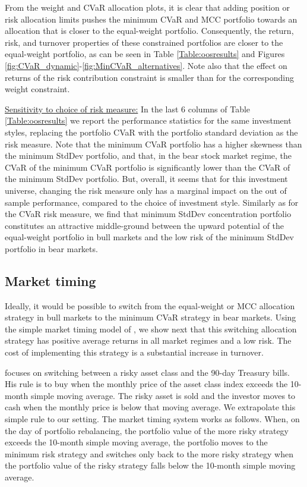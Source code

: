 \documentclass[12pt,a4paper]{article}
\begin{document}
From the weight and CVaR allocation plots, it is clear that adding position or risk allocation limits pushes the minimum CVaR and MCC portfolio towards an allocation that is closer to the equal-weight portfolio. Consequently, the return, risk, and turnover properties of these constrained portfolios are closer to the equal-weight portfolio, as can be seen in Table \ref{Table:oosresults} and Figures \ref{fig:CVaR_dynamic}-\ref{fig:MinCVaR_alternatives}. Note also that the effect on returns of the risk contribution constraint is smaller than for the corresponding weight constraint.

\medskip

\underline{Sensitivity to choice of risk measure:}
In the last 6 columns of Table \ref{Table:oosresults} we report the performance statistics for the same investment styles, replacing the portfolio CVaR with the portfolio standard deviation as the risk measure. Note that the minimum CVaR portfolio has a higher skewness than the minimum StdDev portfolio, and that, in the bear stock market regime, the CVaR of the minimum CVaR
portfolio is significantly lower than the CVaR of the minimum StdDev portfolio.
But, overall, it seems that for this investment universe,  changing the risk measure only has a marginal
impact on the out of sample performance, compared to the choice of investment style. Similarly as for the CVaR risk measure, we find that minimum StdDev concentration portfolio constitutes an attractive middle-ground between the upward potential of the equal-weight portfolio in bull markets and the low risk of the minimum StdDev portfolio in bear markets.

\clearpage

\subsection{Market timing}\label{subsec:tactical}

Ideally, it would be possible to switch from the equal-weight or MCC allocation strategy in bull markets to the minimum CVaR strategy in bear markets. Using the simple market timing model of  \citet{Faber2007}, we show next that this switching allocation strategy has positive average returns in all market regimes and a low risk. The cost of implementing this strategy is a substantial increase in turnover. 

 \citet{Faber2007} focuses on switching between a risky asset class and the 90-day Treasury bills. His rule is to buy when the monthly price of the asset class index exceeds the 10-month simple moving average. The risky asset is sold and the investor moves to cash when the monthly price is below that moving average. We extrapolate this simple rule to our setting. The market timing system works as follows. When, on the day of portfolio rebalancing, the  portfolio value of the more risky strategy exceeds the 10-month simple moving average, the portfolio moves to the minimum risk strategy and switches only back to the more risky strategy when the portfolio value of the risky strategy falls below the 10-month simple moving average. 
 
\end{document}
